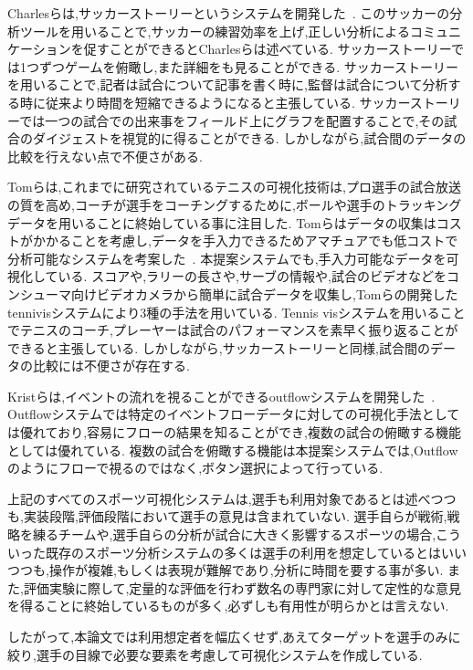 \documentclass[sotsuron]{kuee}
\begin{document}
	Charlesらは,サッカーストーリーというシステムを開発した~\cite{SoccerStory}.
	このサッカーの分析ツールを用いることで,サッカーの練習効率を上げ,正しい分析によるコミュニケーションを促すことができるとCharlesらは述べている.
	サッカーストーリーでは1つずつゲームを俯瞰し,また詳細をも見ることができる.
	サッカーストーリーを用いることで,記者は試合について記事を書く時に,監督は試合について分析する時に従来より時間を短縮できるようになると主張している.
	サッカーストーリーでは一つの試合での出来事をフィールド上にグラフを配置することで,その試合のダイジェストを視覚的に得ることができる.
	しかしながら,試合間のデータの比較を行えない点で不便さがある.
	
	Tomらは,これまでに研究されているテニスの可視化技術は,プロ選手の試合放送の質を高め,コーチが選手をコーチングするために,ボールや選手のトラッキングデータを用いることに終始している事に注目した.
	Tomらはデータの収集はコストがかかることを考慮し,データを手入力できるためアマチュアでも低コストで分析可能なシステムを考案した~\cite{TenniVis}.
	本提案システムでも,手入力可能なデータを可視化している.
	スコアや,ラリーの長さや,サーブの情報や,試合のビデオなどをコンシューマ向けビデオカメラから簡単に試合データを収集し,Tomらの開発したtennivisシステムにより3種の手法を用いている.
	Tennis visシステムを用いることでテニスのコーチ,プレーヤーは試合のパフォーマンスを素早く振り返ることができると主張している.
	しかしながら,サッカーストーリーと同様,試合間のデータの比較には不便さが存在する.
	
	Kristらは,イベントの流れを視ることができるoutflowシステムを開発した~\cite{Outflow}.
	Outflowシステムでは特定のイベントフローデータに対しての可視化手法としては優れており,容易にフローの結果を知ることができ,複数の試合の俯瞰する機能としては優れている.
	複数の試合を俯瞰する機能は本提案システムでは,Outflowのようにフローで視るのではなく,ボタン選択によって行っている.	
	
	上記のすべてのスポーツ可視化システムは,選手も利用対象であるとは述べつつも,実装段階,評価段階において選手の意見は含まれていない.
	選手自らが戦術,戦略を練るチームや,選手自らの分析が試合に大きく影響するスポーツの場合,こういった既存のスポーツ分析システムの多くは選手の利用を想定しているとはいいつつも,操作が複雑,もしくは表現が難解であり,分析に時間を要する事が多い.
	また,評価実験に際して,定量的な評価を行わず数名の専門家に対して定性的な意見を得ることに終始しているものが多く,必ずしも有用性が明らかとは言えない.
	
	したがって,本論文では利用想定者を幅広くせず,あえてターゲットを選手のみに絞り,選手の目線で必要な要素を考慮して可視化システムを作成している.
	
\end{document}
